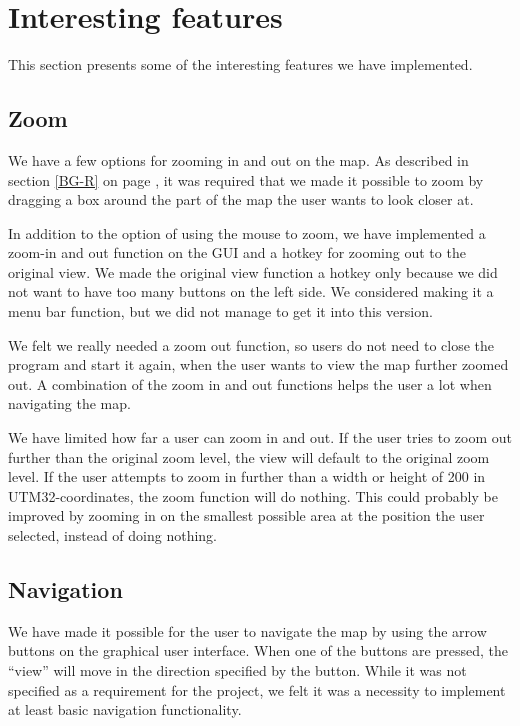 \section{Interesting features}
\label{UIA-IF}
This section presents some of the interesting features we have implemented.
\subsection{Zoom}
\label{UIA-IF-Z}
We have a few options for zooming in and out on the map. As described in
section \ref{BG-R}  on page \pageref{BG-R}, it
was required that we made it possible to zoom by dragging a box around the part 
of the map the user wants to look closer at.

In addition to the option of using the mouse to zoom, we have implemented a
zoom-in and out function on the GUI and a hotkey for zooming out to the original
view. We made the original view function a hotkey only because we did not want
to have too many buttons on the left side. We considered making it a menu bar
function, but we did not manage to get it into this version.

We felt we really needed a zoom out function, so users do not need to close the
program and start it again, when the user wants to view the map further zoomed
out. A combination of the zoom in and out functions helps the user a lot when
navigating the map.

We have limited how far a user can zoom in and out. If the user tries to zoom
out further than the original zoom level, the view will default to the original
zoom level. If the user attempts to zoom in further than a width or height of
200 in UTM32-coordinates, the zoom function will do nothing. This could 
probably be improved by zooming in on the smallest possible area at the 
position the user selected, instead of doing nothing.

\subsection{Navigation}
\label{UIA-IF-N}
We have made it possible for the user to navigate the map by using the arrow
buttons on the graphical user interface. When one of the buttons are pressed,
the ``view'' will move in the direction specified by the button. While it was
not specified as a requirement for the project, we felt it was a necessity to
implement at least basic navigation functionality.

